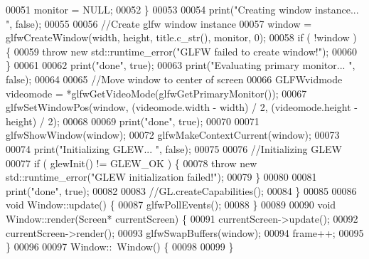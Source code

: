 \begin{DoxyCode}
00051         monitor = NULL;
00052     \}
00053 
00054     print(\textcolor{stringliteral}{"Creating window instance... "}, \textcolor{keyword}{false});
00055 
00056     \textcolor{comment}{//Create glfw window instance}
00057     window = glfwCreateWindow(width, height, title.c\_str(), monitor, 0);
00058     \textcolor{keywordflow}{if} ( !window ) \{
00059         \textcolor{keywordflow}{throw} \textcolor{keyword}{new} std::runtime\_error(\textcolor{stringliteral}{"GLFW failed to create window!"});
00060     \}
00061 
00062     print(\textcolor{stringliteral}{"done"}, \textcolor{keyword}{true}); 
00063     print(\textcolor{stringliteral}{"Evaluating primary monitor... "}, \textcolor{keyword}{false});
00064 
00065     \textcolor{comment}{//Move window to center of screen}
00066     GLFWvidmode videomode = *glfwGetVideoMode(glfwGetPrimaryMonitor());
00067     glfwSetWindowPos(window, (videomode.width - width) / 2, (videomode.height  - height) / 2);
00068 
00069     print(\textcolor{stringliteral}{"done"}, \textcolor{keyword}{true}); 
00070 
00071     glfwShowWindow(window);
00072     glfwMakeContextCurrent(window);
00073 
00074     print(\textcolor{stringliteral}{"Initializing GLEW... "}, \textcolor{keyword}{false});
00075 
00076     \textcolor{comment}{//Initializing GLEW}
00077     \textcolor{keywordflow}{if} ( glewInit() != GLEW\_OK ) \{
00078         \textcolor{keywordflow}{throw} \textcolor{keyword}{new} std::runtime\_error(\textcolor{stringliteral}{"GLEW initialization failed!"});
00079     \}
00080 
00081     print(\textcolor{stringliteral}{"done"}, \textcolor{keyword}{true});
00082 
00083     \textcolor{comment}{//GL.createCapabilities();}
00084 \}
00085 
00086 \textcolor{keywordtype}{void} Window::update() \{
00087     glfwPollEvents();
00088 \}
00089 
00090 \textcolor{keywordtype}{void} Window::render(Screen* currentScreen) \{
00091     currentScreen->update();
00092     currentScreen->render();
00093     glfwSwapBuffers(window);
00094     frame++;
00095 \}
00096 
00097 Window::~Window() \{
00098     
00099 \}
\end{DoxyCode}
